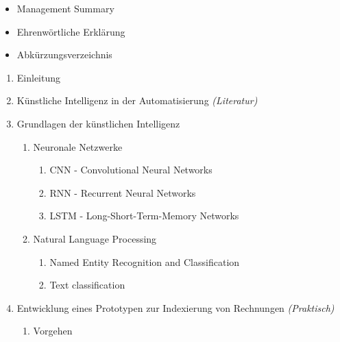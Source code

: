 \documentclass{hwz}
\begin{document}
{
    \renewcommand\labelitemi{--}
    \renewcommand{\labelenumi}{\arabic{enumi}}
    \renewcommand{\labelenumii}{\labelenumi.\arabic{enumii}}
    \renewcommand{\labelenumiii}{\labelenumii.\arabic{enumiii}}
    \begin{itemize}[topsep=0pt,itemsep=2pt,partopsep=4pt, parsep=4pt]
        \item Management Summary
        \item Ehrenwörtliche Erklärung
        \item Abkürzungsverzeichnis
    \end{itemize}
    \begin{enumerate}[topsep=0pt,itemsep=2pt,partopsep=4pt, parsep=4pt]
        \item Einleitung
        \item Künstliche Intelligenz in der Automatisierung \textit{(Literatur)}
        \item Grundlagen der künstlichen Intelligenz
        \begin{enumerate}[topsep=0pt,itemsep=2pt,partopsep=4pt, parsep=4pt]
            \item Neuronale Netzwerke
            \begin{enumerate}[topsep=0pt,itemsep=2pt,partopsep=4pt, parsep=4pt]
                \item CNN - Convolutional Neural Networks
                \item RNN - Recurrent Neural Networks
                \item LSTM - Long-Short-Term-Memory Networks
            \end{enumerate}
            \item Natural Language Processing
            \begin{enumerate}[topsep=0pt,itemsep=2pt,partopsep=4pt, parsep=4pt]
                \item Named Entity Recognition and Classification
                \item Text classification
            \end{enumerate}
        \end{enumerate}
        \item Entwicklung eines Prototypen zur Indexierung von Rechnungen \textit{(Praktisch)}
        \begin{enumerate}[topsep=0pt,itemsep=2pt,partopsep=4pt, parsep=4pt]
            \item Vorgehen

\end{enumerate}
\end{enumerate}}
\end{document}

